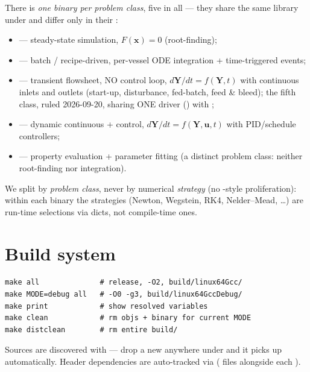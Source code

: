 \documentclass[11pt,a4paper]{article}
\begin{document}
\begin{keyidea}
There is \emph{one binary per problem class}, five in all --- they share
the same library under  and differ
only in their :
\begin{itemize}[leftmargin=*,nosep]
  \item {} --- steady-state simulation, $F(\mathbf{x})=0$
        (root-finding);
  \item {} --- batch / recipe-driven, per-vessel ODE
        integration + time-triggered events;
  \item {} --- transient flowsheet, NO control
        loop, $d\mathbf{Y}/dt = f(\mathbf{Y},t)$ with continuous inlets and
        outlets (start-up, disturbance, fed-batch, feed \& bleed); the fifth
        class, ruled 2026-09-20, sharing ONE driver
        () with ;
  \item {}  --- dynamic continuous + control,
        $d\mathbf{Y}/dt = f(\mathbf{Y},\mathbf{u},t)$ with PID/schedule
        controllers;
  \item {} --- property evaluation + parameter fitting
        (a distinct problem class: neither root-finding nor integration).
\end{itemize}
We split by \emph{problem class}, never by numerical \emph{strategy} (no
-style proliferation): within each binary the strategies
(Newton, Wegstein, RK4, Nelder--Mead, \dots) are run-time selections via
dicts, not compile-time ones.
\end{keyidea}

\section{Build system}

\begin{lstlisting}
make all              # release, -O2, build/linux64Gcc/
make MODE=debug all   # -O0 -g3, build/linux64GccDebug/
make print            # show resolved variables
make clean            # rm objs + binary for current MODE
make distclean        # rm entire build/
\end{lstlisting}

Sources are discovered with  --- drop a new
 anywhere under  and it picks up automatically.
Header dependencies are auto-tracked via  ( files
alongside each ).
\end{document}
